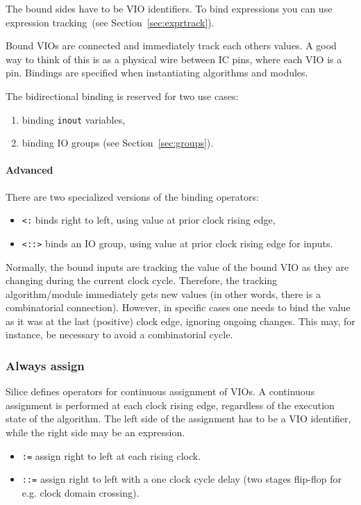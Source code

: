 \documentclass[a4]{article}
\newcommand\silice{Silice}
\begin{document}
The bound sides have to be VIO identifiers. To bind expressions you can use expression tracking~(see Section~\ref{sec:exprtrack}).

Bound VIOs are connected and immediately track each others values.
A good way to think of this is as a physical wire between IC pins, where each VIO is a pin.
Bindings are specified when instantiating algorithms and modules. 

The bidirectional binding is reserved for two use cases:
\begin{enumerate}
\item binding \texttt{inout} variables,
\item binding IO groups (see Section~\ref{sec:groups}).
\end{enumerate}

\paragraph{Advanced}

There are two specialized versions of the binding operators:
\begin{itemize}
	\item \texttt{<:} binds right to left, using value at prior clock rising edge,
	\item \texttt{<::>} binds an IO group, using value at prior clock rising edge for inputs.
\end{itemize}

Normally, the bound inputs are tracking the value of the bound VIO as they are changing during the current clock cycle. Therefore, the tracking algorithm/module immediately gets new values (in other words, there is a combinatorial connection). However, in specific cases one needs to bind the value as it was at the last (positive) clock edge, ignoring ongoing changes. This may, for instance, be necessary to avoid a combinatorial cycle.

\subsubsection{Always assign}
\label{sec:contassign}

\silice{} defines operators for continuous assignment of VIOs.
A continuous assignment is performed at each clock rising edge, regardless of the execution state of the algorithm. The left side of the assignment has to be a VIO identifier, while the right side may be an expression.
\begin{itemize}
\item \texttt{:=} assign right to left at each rising clock.
\item \texttt{::=} assign right to left with a one clock cycle delay (two stages flip-flop for e.g. clock domain crossing).
\end{itemize}
\end{document}
